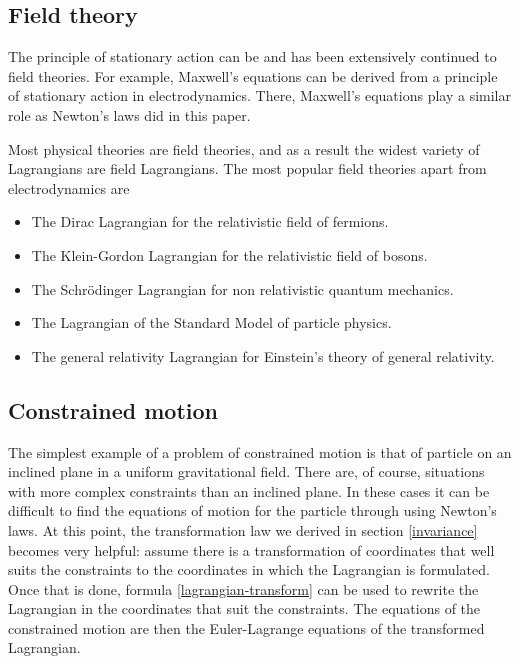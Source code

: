 \documentclass[prb,preprint]{revtex4-1}
\begin{document}
\subsection{Field theory ~\cite{Sterman,Dirac}} \label{field.theory}
The principle of stationary action can be and has been extensively continued to field theories. For example, Maxwell's equations can be derived from a principle of stationary action in electrodynamics. There, Maxwell's equations play a similar role as Newton's laws did in this paper.

Most physical theories are field theories, and as a result the widest variety of Lagrangians are field Lagrangians. The most popular field theories apart from electrodynamics are
\begin{itemize}
  \item The Dirac Lagrangian for the relativistic field of fermions.
  \item The Klein-Gordon Lagrangian for the relativistic field of bosons.
  \item The Schr{\"o}dinger Lagrangian for non relativistic quantum mechanics.
  \item The Lagrangian of the Standard Model of particle physics.
  \item The general relativity Lagrangian for Einstein's theory of general relativity.
\end{itemize}


\subsection{Constrained motion ~\cite{Kuypers}}
The simplest example of a problem of constrained motion is that of particle on an inclined plane in a uniform gravitational field. There are, of course, situations with more complex constraints than an inclined plane. In these cases it can be difficult to find the equations of motion for the particle through using Newton's laws. At this point, the transformation law we derived in section \ref{invariance} becomes very helpful: assume there is a transformation of coordinates that well suits the constraints to the coordinates in which the Lagrangian is formulated. Once that is done, formula \eqref{lagrangian-transform} can be used to rewrite the Lagrangian in the coordinates that suit the constraints. The equations of the constrained motion are then the Euler-Lagrange equations of the transformed Lagrangian.

\end{document}
